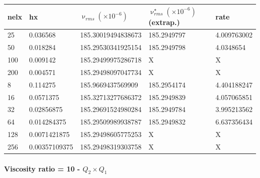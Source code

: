 \newpage
\begin{tabular}{lllll}
\hline
nelx & hx & $\upnu_{rms}(\times 10^{-6})$ & $\upnu^\star_{rms}(\times 10^{-6})$ (extrap.)  & rate \\
\hline\hline
25   & 0.036568 & 185.30019494838673 & 185.2949797 & 4.009763002 \\
50   & 0.018284 & 185.29530341925154 & 185.2949798 & 4.0348654   \\
100  & 0.009142 & 185.29499975286718 & X & X \\
200  & 0.004571 & 185.29498097047734 & X & X \\
\hline
8    & 0.114275      & 185.9669437569909  &  185.2954174 & 4.404188247 \\
16   & 0.0571375     & 185.32713277686372 &  185.2949839 & 4.057065851 \\
32   & 0.02856875    & 185.29691524980284 &  185.2949784 & 3.995213562 \\
64   & 0.014284375   & 185.29509989938787 &  185.2949832 & 6.637356434 \\
128  & 0.0071421875  & 185.29498605775253 &  X           & X           \\
256  & 0.00357109375 & 185.29498319303758 &  X           & X           \\
\hline
\end{tabular}







\newpage
\paragraph{Viscosity ratio = 10 - $Q_2\times Q_1$}

